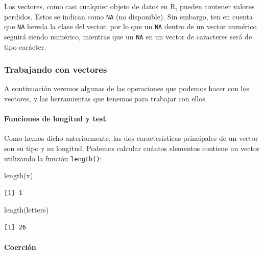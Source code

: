 \documentclass[
  letterpaper,
  DIV=11,
  numbers=noendperiod]{scrreprt}
\let\oldparagraph\paragraph
\renewcommand{\paragraph}[1]{\oldparagraph{#1}\mbox{}}
\newenvironment{Shaded}{\begin{snugshade}}{\end{snugshade}}
\newcommand{\FunctionTok}[1]{\textcolor[rgb]{0.28,0.35,0.67}{#1}}
\newcommand{\NormalTok}[1]{\textcolor[rgb]{0.00,0.23,0.31}{#1}}
\begin{document}
Los vectores, como casi cualquier objeto de datos en R, pueden contener
valores perdidos. Estos se indican como \texttt{NA} (no disponible). Sin
embargo, ten en cuenta que \texttt{NA} hereda la clase del vector, por
lo que un \texttt{NA} dentro de un vector numérico seguirá siendo
numérico, mientras que un \texttt{NA} en un vector de caracteres será de
tipo carácter.

\hypertarget{trabajando-con-vectores}{%
\subsubsection{Trabajando con vectores}\label{trabajando-con-vectores}}

A continuación veremos algunas de las operaciones que podemos hacer con
los vectores, y las herramientas que tenemos para trabajar con ellos

\hypertarget{funciones-de-longitud-y-test}{%
\paragraph{Funciones de longitud y
test}\label{funciones-de-longitud-y-test}}

Como hemos dicho anteriormente, las dos características principales de
un vector son su tipo y su longitud. Podemos calcular cuántos elementos
contiene un vector utilizando la función \texttt{length()}:

\begin{Shaded}
\begin{Highlighting}[]
\FunctionTok{length}\NormalTok{(x)}
\end{Highlighting}
\end{Shaded}

\begin{verbatim}
[1] 1
\end{verbatim}

\begin{Shaded}
\begin{Highlighting}[]
\FunctionTok{length}\NormalTok{(letters)}
\end{Highlighting}
\end{Shaded}

\begin{verbatim}
[1] 26
\end{verbatim}

\hypertarget{coerciuxf3n}{%
\paragraph{Coerción}\label{coerciuxf3n}}
\end{document}
